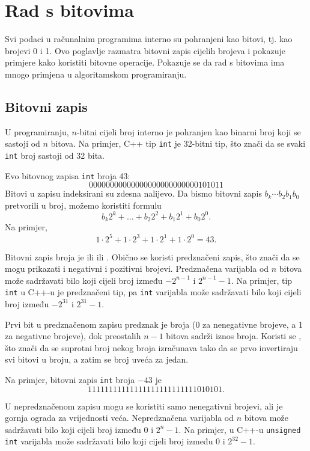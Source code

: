 \chapter{Rad s bitovima}

Svi podaci u računalnim programima interno su pohranjeni kao bitovi,
tj. kao brojevi 0 i 1.
Ovo poglavlje razmatra bitovni zapis
cijelih brojeva i pokazuje primjere
kako koristiti bitovne operacije.
Pokazuje se da rad s bitovima ima mnogo primjena
u algoritamskom programiranju.

\section{Bitovni zapis}


U programiranju, $n$-bitni cijeli broj interno je
pohranjen kao binarni broj koji se sastoji od $n$ bitova.
Na primjer, C++ tip \texttt{int} je
32-bitni tip, što znači da se svaki \texttt{int}
broj sastoji od 32 bita.

Evo bitovnog zapisa
\texttt{int} broja 43: 
\[00000000000000000000000000101011\]
Bitovi u zapisu indeksirani su zdesna nalijevo.
Da bismo bitovni zapis $b_k \cdots b_2 b_1 b_0$ pretvorili u broj,
možemo koristiti formulu
\[b_k 2^k + \ldots + b_2 2^2 + b_1 2^1 + b_0 2^0.\]
Na primjer,
\[1 \cdot 2^5 + 1 \cdot 2^3 + 1 \cdot 2^1 + 1 \cdot 2^0 = 43.\]

Bitovni zapis broja je ili
 ili .
Obično se koristi predznačeni zapis,
što znači da se mogu prikazati i negativni
i pozitivni brojevi.
Predznačena varijabla od $n$ bitova može sadržavati bilo koji
cijeli broj između $-2^{n-1}$ i $2^{n-1}-1$.
Na primjer, tip \texttt{int} u C++-u je
predznačeni tip, pa \texttt{int} varijabla može sadržavati bilo koji
cijeli broj između $-2^{31}$ i $2^{31}-1$.

Prvi bit u predznačenom zapisu
predznak je broja (0 za nenegativne brojeve,
a 1 za negativne brojeve), dok
preostalih $n-1$ bitova sadrži iznos broja.
Koristi se , što znači da se
suprotni broj nekog broja izračunava tako da se prvo
invertiraju svi bitovi u broju,
a zatim se broj uveća za jedan.

Na primjer, bitovni zapis
\texttt{int} broja $-43$ je
\[11111111111111111111111111010101.\]

U nepredznačenom zapisu mogu se koristiti samo nenegativni
brojevi, ali je gornja ograda za vrijednosti veća.
Nepredznačena varijabla od $n$ bitova može sadržavati bilo koji
cijeli broj između $0$ i $2^n-1$.
Na primjer, u C++-u \texttt{unsigned int} varijabla
može sadržavati bilo koji cijeli broj između $0$ i $2^{32}-1$.

